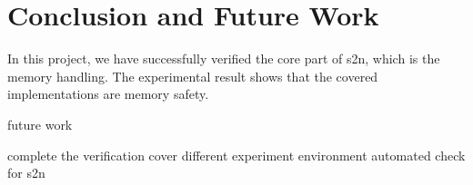 \chapter{Conclusion and Future Work}
In this project, we have successfully verified the core part of s2n, which is the memory handling. The experimental result shows that the covered implementations are memory safety. 


future work 

complete the verification
cover different experiment environment
automated check for s2n







